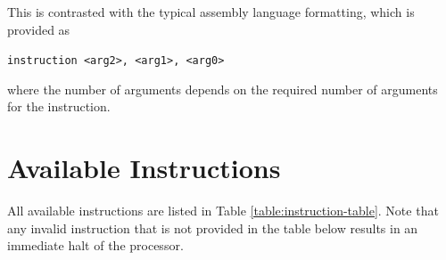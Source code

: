 \documentclass{article}
\begin{document}
This is contrasted with the typical assembly language formatting, which is provided as

\begin{center}
	\texttt{instruction <arg2>, <arg1>, <arg0>}
\end{center}

where the number of arguments depends on the required number of arguments for the instruction.

\pagebreak

\section{Available Instructions}

All available instructions are listed in Table \ref{table:instruction-table}. Note that any invalid instruction that is not provided in the table below results in an immediate halt of the processor.
\end{document}
